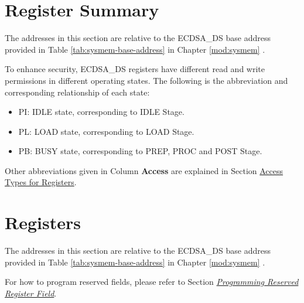 \documentclass[main\_\_EN.tex]{subfiles}
\begin{document}


\newpage
\hypertarget{ecdsa-reg-summ}{}
\section{Register Summary}
\label{sec:ecdsa-reg-summ}

The addresses in this section are relative to the ECDSA\_DS base address provided in Table \ref{tab:sysmem-base-address} in Chapter \ref{mod:sysmem} \textit{}.

To enhance security, ECDSA\_DS registers have different read and write permissions in different operating states. The following is the abbreviation and corresponding relationship of each state:

\begin{itemize}
    \item PI: IDLE state, corresponding to IDLE Stage.
    \item PL: LOAD state, corresponding to LOAD Stage.
    \item PB: BUSY state, corresponding to PREP, PROC and POST Stage.
\end{itemize}

Other abbreviations given in Column \textbf{Access} are explained in Section \hyperref[glossary-access-types]{Access Types for Registers}.






\newpage
\section{Registers}

The addresses in this section are relative to the ECDSA\_DS base address provided in Table \ref{tab:sysmem-base-address} in Chapter \ref{mod:sysmem} \textit{}.

For how to program reserved fields, please refer to Section \hyperref[programming-reserved-field]{\textit{Programming Reserved Register Field}}.


\end{document}
